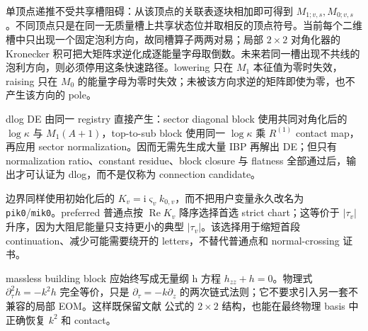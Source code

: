 \documentclass[11pt,a4paper]{ctexart}
\newcommand{\ii}{\mathrm i}
\begin{document}
单顶点递推不受共享槽阻碍：从该顶点的关联表逐块相加即可得到 $M_{1;v,s},M_{0;v,s}$。不同顶点只是在同一无质量槽上共享状态位并取相反的顶点符号。当前每个二维槽中只出现一个固定泡利方向，故同槽算子两两对易；局部 $2\times2$ 对角化器的 Kronecker 积可把大矩阵求逆化成逐能量字母取倒数。未来若同一槽出现不共线的泡利方向，则必须停用这条快速路径。lowering 只在 $M_1$ 本征值为零时失效，raising 只在 $M_0$ 的能量字母为零时失效；未被该方向求逆的矩阵即使为零，也不产生该方向的 pole。

dlog DE 由同一 registry 直接产生：sector diagonal block 使用共同对角化后的 $\log\kappa$ 与 $M_1(A+1)$，top-to-sub block 使用同一 $\log\kappa$ 乘 $R^{(1)}$ contact map，再应用 sector normalization。因而无需先生成大量 IBP 再解出 DE；但只有 normalization ratio、constant residue、block closure 与 flatness 全部通过后，输出才可认证为 dlog，而不是仅称为 connection candidate。

边界同样使用初始化后的 $K_v=\ii\varsigma_vk_{0,v}$，而不把用户变量永久改名为 \texttt{pik0}/\texttt{mik0}。preferred 普通点按 $\operatorname{Re}K_v$ 降序选择首选 strict chart；这等价于 $|\tau_v|$ 升序，因为大阻尼能量只支持更小的典型 $|\tau_v|$。该选择用于缩短首段 continuation、减少可能需要绕开的 letters，不替代普通点和 normal-crossing 证书。

massless building block 应始终写成无量纲 h 方程 $h_{zz}+h=0$。物理式 $\partial_\tau^2h=-k^2h$ 完全等价，只是 $\partial_\tau=-k\partial_z$ 的两次链式法则；它不要求引入另一套不兼容的局部 EOM。这样既保留文献 \cite{Chen:2023eic} 公式的 $2\times2$ 结构，也能在最终物理 basis 中正确恢复 $k^2$ 和 contact。



\end{document}
